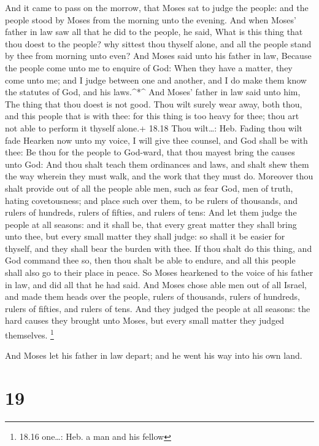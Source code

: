  And it came to pass on the morrow, that Moses sat to judge
the people: and the people stood by Moses from the morning unto the
evening.  And when Moses' father in law saw all that he did
to the people, he said, What is this thing that thou doest to the
people? why sittest thou thyself alone, and all the people stand by thee
from morning unto even?  And Moses said unto his father in
law, Because the people come unto me to enquire of God: 
When they have a matter, they come unto me; and I judge between one and
another, and I do make them know the statutes of God, and his
laws.\^{}*\^{}  And Moses' father in law said unto him, The
thing that thou doest is not good.  Thou wilt surely wear
away, both thou, and this people that is with thee: for this thing is
too heavy for thee; thou art not able to perform it thyself alone.+
18.18 Thou wilt\ldots: Heb. Fading thou wilt fade  Hearken
now unto my voice, I will give thee counsel, and God shall be with thee:
Be thou for the people to God-ward, that thou mayest bring the causes
unto God:  And thou shalt teach them ordinances and laws,
and shalt shew them the way wherein they must walk, and the work that
they must do.  Moreover thou shalt provide out of all the
people able men, such as fear God, men of truth, hating covetousness;
and place such over them, to be rulers of thousands, and rulers of
hundreds, rulers of fifties, and rulers of tens:  And let
them judge the people at all seasons: and it shall be, that every great
matter they shall bring unto thee, but every small matter they shall
judge: so shall it be easier for thyself, and they shall bear the burden
with thee.  If thou shalt do this thing, and God command
thee so, then thou shalt be able to endure, and all this people shall
also go to their place in peace.  So Moses hearkened to the
voice of his father in law, and did all that he had said. 
And Moses chose able men out of all Israel, and made them heads over the
people, rulers of thousands, rulers of hundreds, rulers of fifties, and
rulers of tens.  And they judged the people at all seasons:
the hard causes they brought unto Moses, but every small matter they
judged themselves. \footnote{18.16 one\ldots: Heb. a man and his fellow}

 And Moses let his father in law depart; and he went his
way into his own land.

\hypertarget{section-18}{%
\section{19}\label{section-18}}

